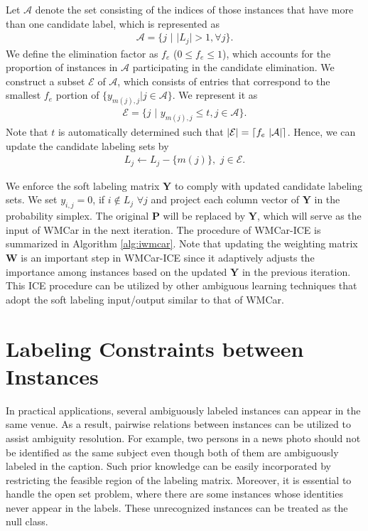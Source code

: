 \documentclass[10pt,journal,compsoc]{IEEEtran}
\DeclarePairedDelimiter\ceil{\lceil}{\rceil}
\begin{document}
Let $\mathcal{A}$ denote the set consisting of the indices of those instances that have more than one candidate label, which is represented as
\begin{align}
     \mathcal{A} =\{j  \,\, | \,\, |L_j| > 1, \forall j\}.
\end{align}
We define the elimination factor as $f_e$ ($ 0 \leq f_e \leq 1$), which accounts for the proportion of instances in $\mathcal{A}$ participating in the candidate elimination.
We construct a subset $\mathcal{E}$ of $\mathcal{A}$, which consists of entries that correspond to the smallest $f_e$ portion of $\{y_{m(j),j} | j \in \mathcal{A} \}$. We represent it as
\begin{align}
     \mathcal{E} =\{j  \,\, | \,\,  y_{m(j),j} \leq t,  j \in \mathcal{A} \}. \label{eqn:e_set}
\end{align}
Note that $t$ is automatically determined such that $|\mathcal{E}| = \ceil*{f_e \,\, |\mathcal{A}|}$.
Hence, we can update the candidate labeling sets by
\begin{align}
     L_j  \leftarrow L_j -  \{m(j)\}, \,\, j \in \mathcal{E}. \label{eqn:l_update}
\end{align}

We enforce the soft labeling matrix $\mathbf{Y}$ to comply with updated candidate labeling sets. We set $y_{i,j} = 0$, if $ i \notin L_j$ $\forall j$ and project each column vector of $\mathbf{Y}$ in the probability simplex. The original $\mathbf{P}$ will be replaced by $\mathbf{Y}$, which will serve as the input of WMCar in the next iteration.
The procedure of WMCar-ICE is summarized in Algorithm \ref{alg:iwmcar}.
Note that updating the weighting matrix $\mathbf{W}$ is an important step in WMCar-ICE since it adaptively adjusts the importance among instances based on the updated $\mathbf{Y}$ in the previous iteration.
This ICE procedure can be utilized by other ambiguous learning techniques that adopt the soft labeling input/output similar to that of WMCar.






\section{Labeling Constraints between Instances} \label{sec:lpc}
In practical applications, several ambiguously labeled instances can appear in the same venue.  As a result, pairwise relations between instances can be utilized to assist ambiguity resolution. For example, two persons in a news photo should not be identified as the same subject even though both of them are ambiguously labeled in the caption. Such prior knowledge can be easily incorporated by restricting the feasible region of the labeling matrix. Moreover, it is essential to handle the open set problem, where there are some instances whose identities never appear in the labels. These unrecognized instances can be treated as the null class.
\end{document}
